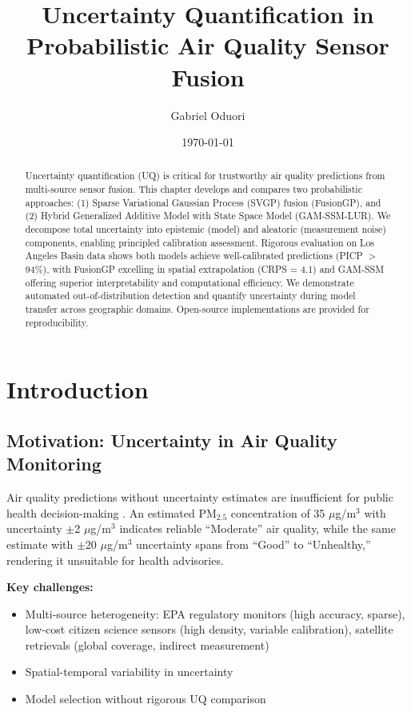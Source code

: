 \documentclass[11pt,letterpaper]{article}
\title{\textbf{Uncertainty Quantification in Probabilistic Air Quality Sensor Fusion}}
\author{Gabriel Oduori}
\date{\today}
\begin{document}
\maketitle

\begin{abstract}
Uncertainty quantification (UQ) is critical for trustworthy air quality predictions from multi-source sensor fusion. This chapter develops and compares two probabilistic approaches: (1) Sparse Variational Gaussian Process (SVGP) fusion (FusionGP), and (2) Hybrid Generalized Additive Model with State Space Model (GAM-SSM-LUR). We decompose total uncertainty into epistemic (model) and aleatoric (measurement noise) components, enabling principled calibration assessment. Rigorous evaluation on Los Angeles Basin data shows both models achieve well-calibrated predictions (PICP $>$ 94\%), with FusionGP excelling in spatial extrapolation (CRPS = 4.1) and GAM-SSM offering superior interpretability and computational efficiency. We demonstrate automated out-of-distribution detection and quantify uncertainty during model transfer across geographic domains. Open-source implementations are provided for reproducibility.
\end{abstract}


\section{Introduction} \label{sec:intro}

\subsection{Motivation: Uncertainty in Air Quality Monitoring}

Air quality predictions without uncertainty estimates are insufficient for public health decision-making \citep{shaddick2018data}. An estimated PM$_{2.5}$ concentration of 35 $\mu$g/m$^3$ with uncertainty $\pm$2 $\mu$g/m$^3$ indicates reliable ``Moderate'' air quality, while the same estimate with $\pm$20 $\mu$g/m$^3$ uncertainty spans from ``Good'' to ``Unhealthy,'' rendering it unsuitable for health advisories.

\textbf{Key challenges:}
\begin{itemize}
    \item Multi-source heterogeneity: EPA regulatory monitors (high accuracy, sparse), low-cost citizen science sensors (high density, variable calibration), satellite retrievals (global coverage, indirect measurement)
    \item Spatial-temporal variability in uncertainty
    \item Model selection without rigorous UQ comparison
\end{itemize}
\end{document}
